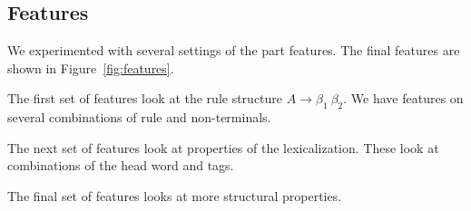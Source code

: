\documentclass[11pt,letterpaper]{article}
\DeclareMathOperator*{\argmax}{arg\,max}
\newcommand{\Rule}[3]{#1 \rightarrow #2\ #3}
\begin{document}
\subsection{Features}








We experimented with several settings of the part features.
The final features are shown in  Figure~\ref{fig:features}.

The first set of features look at the rule structure $\Rule{A}{\beta_1}{\beta_2}$.
We have features on several combinations of rule and non-terminals.

The next set of features look at properties of the lexicalization.
These look at combinations of the head word and tags.

The final set of features looks at more structural properties.




\cite{}
\cite{}
\cite{}
\end{document}
